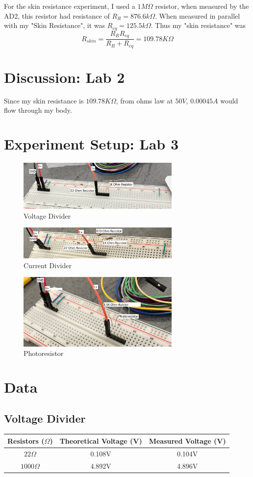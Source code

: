 \documentclass[12pt]{article}
\begin{document}
For the skin resistance experiment, I used a $1M\Omega$ resistor, when measured by the AD2, this resistor had resistance of $R_R=876.6k\Omega$. When measured in parallel with my "Skin Resistance", it was $R_{eq}=125.5k\Omega$. Thus my "skin resistance" was
$$R_{skin}=\frac{R_RR_{eq}}{R_R+R_{eq}}=109.78K\Omega$$
\pagebreak
\section*{Discussion: Lab 2}
Since my skin resistance is $109.78K\Omega$, from ohms law at $50V$, $0.00045A$ would flow through my body.
\pagebreak
\section*{Experiment Setup: Lab 3}
\begin{figure}[h]
\includegraphics[width=8cm]{VoltageDivider}
\centering
\caption{Voltage Divider}
\centering
\end{figure}
\begin{figure}[h]
\includegraphics[width=8cm]{CurrentDivider}
\centering
\caption{Current Divider}
\centering
\end{figure}
\begin{figure}[h]
\includegraphics[width=8cm]{PhotoResistor}
\centering
\caption{Photoresistor}
\centering
\end{figure}
\section*{Data}
\subsection*{Voltage Divider}
\begin{center}
\begin{tabular}{||c|c|c ||}
\hline
Resistors ($\Omega$) & Theoretical Voltage (V) & Measured Voltage (V)\\
\hline
\hline
$22\Omega$  &0.108V &0.104V\\
\hline
$1000\Omega$ &4.892V &4.896V\\
\hline
\end{tabular}
\end{center}
\end{document}
